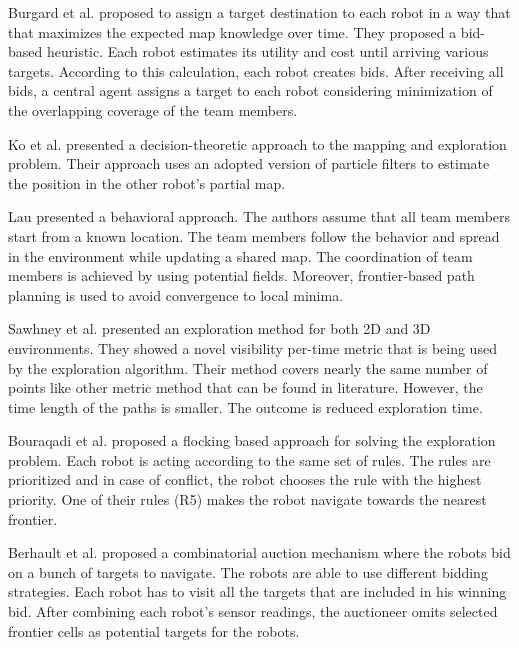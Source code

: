 \documentclass[a4paper,10pt]{article}
\begin{document}
Burgard et al. \cite{simmons_coordination_2000} proposed to assign a
target destination to each robot in a way that that maximizes the expected
map knowledge over time.
They proposed a bid-based heuristic. Each robot estimates
its utility and cost until arriving various targets. According to this
calculation, each robot creates bids. After receiving all bids, a central
agent assigns a target to each robot considering minimization of the overlapping
coverage of the team members. 

Ko et al. \cite{ko_practical_2003} presented a decision-theoretic approach to
the mapping and exploration problem. Their approach uses an adopted version of
particle filters to estimate the position in the other robot's partial map.

Lau \cite{lau_behavioural_2003} presented a behavioral approach.
The authors assume that all team members start from a known
location. The team members follow the behavior and spread in the
environment while updating a shared map. The coordination of team
members is achieved by using potential fields. Moreover, frontier-based path
planning is used to avoid convergence to local minima.

Sawhney et al. \cite{sawhney_fast_2009} presented an exploration
method for both 2D and 3D environments. They showed a novel visibility
per-time metric that is being used by the exploration algorithm. 
Their method covers nearly the same number of points like other metric method
that can be found in literature. However, the time length of the paths is
smaller. The outcome is reduced exploration time. 

Bouraqadi et al. \cite{bouraqadi_flocking-based_????} proposed a flocking based
approach for solving the exploration problem. Each robot is acting according 
to the same set of rules. The rules are prioritized and in case of
conflict, the robot chooses the rule with the highest priority. One of their
rules (R5) makes the robot navigate towards the nearest frontier.

Berhault et al. \cite{berhault_robot_2003} proposed a combinatorial
auction mechanism where the robots bid on a bunch of targets to navigate. The
robots are able to use different bidding strategies. Each robot has to visit
all the targets that are included in his winning bid. After combining each
robot's sensor readings, the auctioneer omits selected frontier cells as
potential targets for the robots.%
\end{document}

